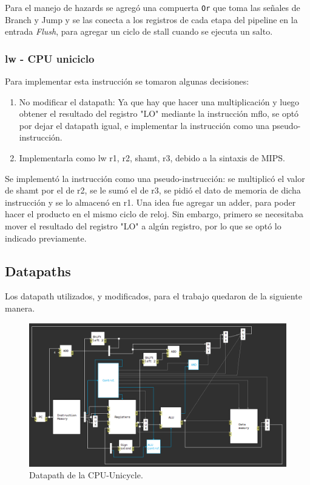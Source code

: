 \documentclass[a4paper, 12pt]{article}
\begin{document}
	Para el manejo de hazards se agregó una compuerta \texttt{Or} que toma las señales de Branch y Jump y se las conecta a los registros de cada etapa del pipeline en la entrada \textit{Flush}, para agregar un ciclo de stall cuando se ejecuta un salto.
	\subsubsection{lw - CPU uniciclo}
	Para implementar esta instrucción se tomaron algunas decisiones:
	\begin{enumerate}
	\item No modificar el datapath: Ya que hay que hacer una multiplicación y luego obtener el resultado del registro "LO" mediante la instrucción mflo, se optó por dejar el datapath igual, e implementar la instrucción como una pseudo-instrucción.
	\item Implementarla como lw r1, r2, shamt, r3, debido a la sintaxis de MIPS.
	\end{enumerate}
	Se implementó la instrucción como una pseudo-instrucción: se multiplicó el valor de shamt por el de r2, se le sumó el de r3, se pidió el dato de memoria de dicha instrucción y se lo almacenó en r1.
	Una idea fue agregar un adder, para poder hacer el producto en el mismo ciclo de reloj. Sin embargo, primero se necesitaba mover el resultado del registro "LO" a algún registro, por lo que se optó lo indicado previamente.
	
	
	\subsection{Datapaths}
	Los datapath utilizados, y modificados, para el trabajo quedaron de la siguiente manera.
	
		\begin{figure}[h]
	  		\centering
			    \includegraphics[width=\textwidth]{files/cpuunicycle.png}
		 	 \caption{Datapath de la CPU-Unicycle.}
	  		\label{fig}
		\end{figure}
	
\end{document}
